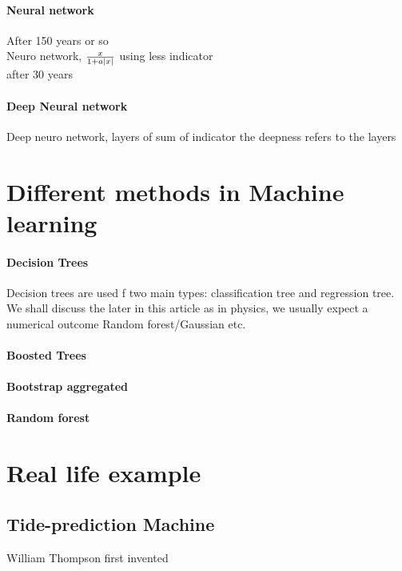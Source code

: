 \documentclass[12pt,a4paper]{article}
\begin{document}
\paragraph{Neural network}
After 150 years or so \\
Neuro network, $\frac{x}{1+a\abs{x}}$ using less indicator\\
after 30 years\\
\paragraph{Deep Neural network}
Deep neuro network, layers of sum of indicator
the deepness refers to the layers

\section{Different methods in Machine learning}
\paragraph{Decision Trees}

Decision trees are used f two main types: classification tree and regression tree. We shall discuss the later in this article as in physics, we usually expect a numerical outcome 
Random forest/Gaussian etc.
\paragraph{Boosted Trees}
\paragraph{Bootstrap aggregated}
\paragraph{Random forest}


\section{Real life example}
\subsection{Tide-prediction Machine}
William Thompson first invented 
\end{document}
